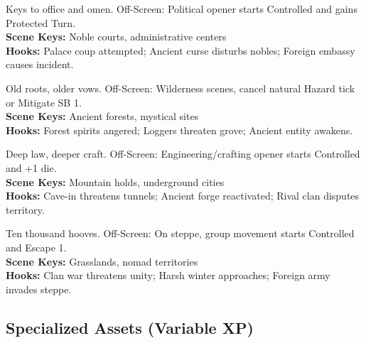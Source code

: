 \documentclass[12pt]{article}
\begin{document}
\begin{description}[leftmargin=*]
  \item[\textbf{Ashaani Palace Complex}] Keys to office and omen. Off-Screen: Political opener starts Controlled and gains Protected Turn. \\
  \textbf{Scene Keys:} Noble courts, administrative centers \\
  \textbf{Hooks:} Palace coup attempted; Ancient curse disturbs nobles; Foreign embassy causes incident.

  \item[\textbf{Valewood Grove Sanctuary}] Old roots, older vows. Off-Screen: Wilderness scenes, cancel natural Hazard tick or Mitigate SB 1. \\
  \textbf{Scene Keys:} Ancient forests, mystical sites \\
  \textbf{Hooks:} Forest spirits angered; Loggers threaten grove; Ancient entity awakens.

  \item[\textbf{Dwarven Mountain Hall}] Deep law, deeper craft. Off-Screen: Engineering/crafting opener starts Controlled and +1 die. \\
  \textbf{Scene Keys:} Mountain holds, underground cities \\
  \textbf{Hooks:} Cave-in threatens tunnels; Ancient forge reactivated; Rival clan disputes territory.

  \item[\textbf{Ykrul Steppe Confederation}] Ten thousand hooves. Off-Screen: On steppe, group movement starts Controlled and Escape 1. \\
  \textbf{Scene Keys:} Grasslands, nomad territories \\
  \textbf{Hooks:} Clan war threatens unity; Harsh winter approaches; Foreign army invades steppe.
\end{description}

\subsection*{Specialized Assets (Variable XP)}
\end{document}
